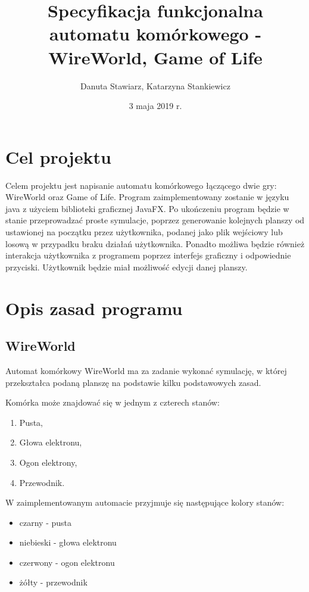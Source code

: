 \documentclass[10pt, oneside]{article}
\title{Specyfikacja funkcjonalna automatu komórkowego - WireWorld, Game of Life}
\author{Danuta Stawiarz, Katarzyna Stankiewicz}
\date{3 maja 2019 r.}
\begin{document}
\maketitle
\tableofcontents
\newpage	

\section{Cel projektu}

Celem projektu jest napisanie automatu komórkowego łączącego dwie gry: WireWorld oraz Game of Life. Program zaimplementowany zostanie w języku java z użyciem biblioteki graficznej JavaFX. Po ukończeniu program będzie w stanie przeprowadzać proste symulacje, poprzez generowanie kolejnych planszy od ustawionej na początku przez użytkownika, podanej jako plik wejściowy lub losową w przypadku braku działań użytkownika. Ponadto możliwa będzie również interakcja użytkownika z programem poprzez interfejs graficzny i odpowiednie przyciski. Użytkownik będzie miał możliwość edycji danej planszy. 

\section{Opis zasad programu}

\subsection{WireWorld}

Automat komórkowy WireWorld ma za zadanie wykonać symulację, w której przekształca podaną planszę na podstawie kilku podstawowych zasad.

 Komórka może znajdować się w jednym z czterech stanów:

\begin{enumerate}
\item Pusta,
\item Głowa elektronu,
\item Ogon elektrony,
\item Przewodnik.
\end{enumerate}

W zaimplementowanym automacie przyjmuje się następujące kolory stanów:
\begin{itemize}
\item czarny - pusta
\item niebieski - głowa elektronu
\item czerwony - ogon elektronu
\item żółty - przewodnik
\end{itemize}
\end{document}

